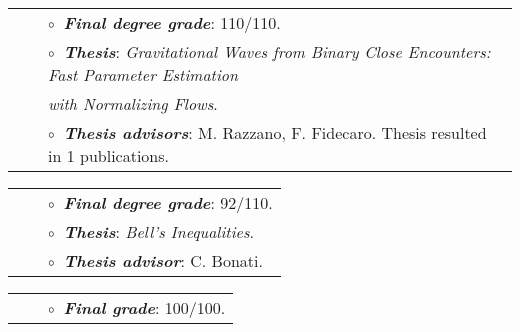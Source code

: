 \vspace{0.2cm}
\vspace{-0.1cm}
\begin{tabular}{rcl}
&\hspace{0.4cm} &$\circ\;\;${\textbf{\textit{Final degree grade}}}: 110/110.\\
&\hspace{0.4cm} &$\circ\;\;${\textbf{\textit{Thesis}}}: \textit{Gravitational Waves from Binary Close Encounters: Fast Parameter Estimation} \\&\hspace{0.4cm} & 
\hspace{0.4cm}
\textit{\phantom{Thesis } with Normalizing Flows}.\\
&\hspace{0.4cm} &$\circ\;\;${\textbf{\textit{Thesis advisors}}}: M. Razzano, F. Fidecaro. Thesis resulted in 1 publications.\\

\end{tabular}

\vspace{0.2cm}
\vspace{-0.1cm}
\begin{tabular}{rcl}
&\hspace{0.4cm} &$\circ\;\;${\textbf{\textit{Final degree grade}}}: 92/110.\\
&\hspace{0.4cm} &$\circ\;\;${\textbf{\textit{Thesis}}}: \textit{Bell's Inequalities}.\\
&\hspace{0.4cm} &$\circ\;\;${\textbf{\textit{Thesis advisor}}}:  C. Bonati.\\
\end{tabular}


\vspace{0.2cm}
\vspace{-0.1cm}
\begin{tabular}{rcl}
&\hspace{0.4cm} &$\circ\;\;${\textbf{\textit{Final grade}}}:  100/100.\\
\end{tabular}

